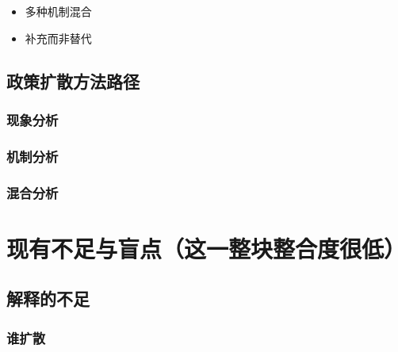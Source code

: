 \documentclass[
  12pt,
]{ctexart}
\begin{document}
\begin{itemize}
\item
  多种机制混合
\item
  补充而非替代
\end{itemize}

\hypertarget{ux653fux7b56ux6269ux6563ux65b9ux6cd5ux8defux5f84}{%
\subsection{政策扩散方法路径}\label{ux653fux7b56ux6269ux6563ux65b9ux6cd5ux8defux5f84}}

\hypertarget{ux73b0ux8c61ux5206ux6790}{%
\subsubsection{现象分析}\label{ux73b0ux8c61ux5206ux6790}}

\hypertarget{ux673aux5236ux5206ux6790}{%
\subsubsection{机制分析}\label{ux673aux5236ux5206ux6790}}

\hypertarget{ux6df7ux5408ux5206ux6790}{%
\subsubsection{混合分析}\label{ux6df7ux5408ux5206ux6790}}

\hypertarget{ux73b0ux6709ux4e0dux8db3ux4e0eux76f2ux70b9ux8fd9ux4e00ux6574ux5757ux6574ux5408ux5ea6ux5f88ux4f4e}{%
\section{现有不足与盲点（这一整块整合度很低）}\label{ux73b0ux6709ux4e0dux8db3ux4e0eux76f2ux70b9ux8fd9ux4e00ux6574ux5757ux6574ux5408ux5ea6ux5f88ux4f4e}}

\hypertarget{ux89e3ux91caux7684ux4e0dux8db3}{%
\subsection{解释的不足}\label{ux89e3ux91caux7684ux4e0dux8db3}}

\hypertarget{ux8c01ux6269ux6563}{%
\subsubsection{谁扩散}\label{ux8c01ux6269ux6563}}
\end{document}
